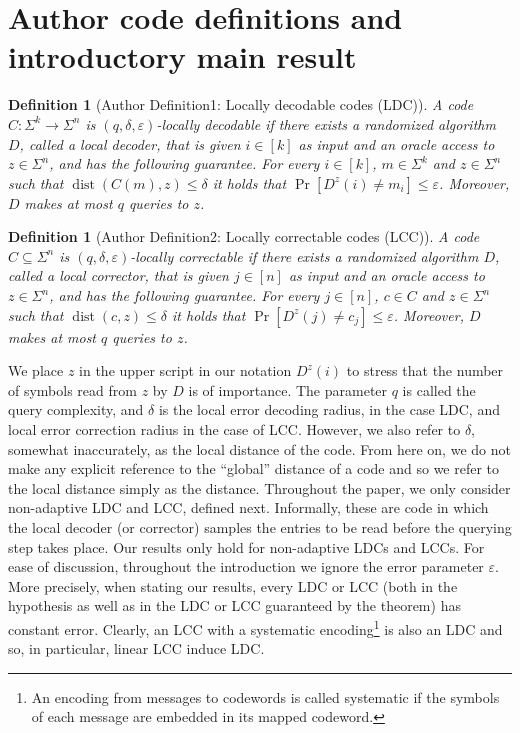 \documentclass[10pt,a4paper]{article}
\newtheorem{ntdefinition}[nttheorem]{Definition}
\begin{document}
\section*{Author code definitions and introductory main result}
\setcounter{nttheorem}{0}
\begin{ntdefinition}[Author Definition1: Locally decodable codes (LDC)]
A code $C:\Sigma^k\to\Sigma^n$ is $(q,\delta,\varepsilon)$-locally decodable if there exists a randomized algorithm $D$, called a local decoder, that is given $i\in[k]$ as input and an oracle access to $z\in\Sigma^n$, and has the following guarantee. For every $i\in[k]$, $m\in\Sigma^k$ and $z\in\Sigma^n$ such that $\operatorname{dist}(C(m),z)\leq\delta$ it holds that $\Pr[D^z(i)\ne m_i]\leq\varepsilon$. Moreover, $D$ makes at most $q$ queries to $z$.
\end{ntdefinition}
\begin{ntdefinition}[Author Definition2: Locally correctable codes (LCC)]
A code $C\subseteq\Sigma^n$ is $(q,\delta,\varepsilon)$-locally correctable if there exists a randomized algorithm $D$, called a local corrector, that is given $j\in[n]$ as input and an oracle access to $z\in\Sigma^n$, and has the following guarantee. For every $j\in[n]$, $c\in C$ and $z\in\Sigma^n$ such that $\operatorname{dist}(c,z)\leq\delta$ it holds that $\Pr[D^z(j)\ne c_j]\leq\varepsilon$. Moreover, $D$ makes at most $q$ queries to $z$.
\end{ntdefinition}
We place $z$ in the upper script in our notation $D^z(i)$ to stress that the number of symbols read from $z$ by $D$ is of importance. The parameter $q$ is called the query complexity, and $\delta$ is the local error decoding radius, in the case LDC, and local error correction radius in the case of LCC. However, we also refer to $\delta$, somewhat inaccurately, as the local distance of the code. From here on, we do not make any explicit reference to the ``global'' distance of a code and so we refer to the local distance simply as the distance. Throughout the paper, we only consider non-adaptive LDC and LCC, defined next. Informally, these are code in which the local decoder (or corrector) samples the entries to be read before the querying step takes place. Our results only hold for non-adaptive LDCs and LCCs. For ease of discussion, throughout the introduction we ignore the error parameter $\varepsilon$. More precisely, when stating our results, every LDC or LCC (both in the hypothesis as well as in the LDC or LCC guaranteed by the theorem) has constant error.
Clearly, an LCC with a systematic encoding\footnote{An encoding from messages to codewords is called systematic if the symbols of each message are embedded in its mapped codeword.} is also an LDC and so, in particular, linear LCC induce LDC.
\end{document}
